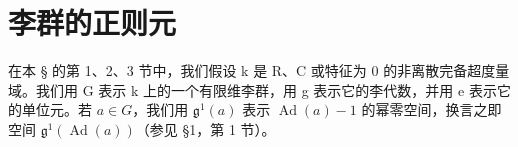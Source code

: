 \section{李群的正则元}

在本 § 的第 1、2、3 节中，我们假设 k 是 R、C 或特征为 0 的非离散完备超度量域。我们用 G 表示 k 上的一个有限维李群，用 g 表示它的李代数，并用 e 表示它的单位元。若 \(a \in G\)，我们用 \(\mathfrak{g}^{1}(a)\) 表示 \(\operatorname{Ad}(a) - 1\) 的幂零空间，换言之即空间 \(\mathfrak{g}^{1}(\operatorname{Ad}(a))\)（参见 §1，第 1 节）。

